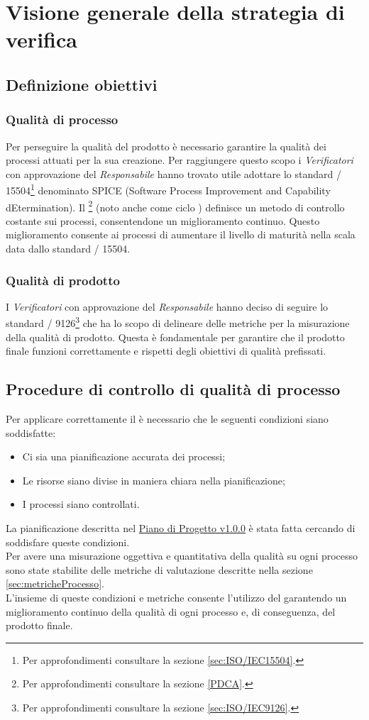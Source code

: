 \documentclass{scalatekids-article}
\begin{document}
\section{Visione generale della strategia di verifica}
\subsection{Definizione obiettivi}
\subsubsection{Qualità di processo}
Per perseguire la qualità del prodotto è necessario garantire la qualità dei processi attuati per la sua creazione. Per raggiungere questo scopo i \textit{Verificatori} con approvazione del \textit{Responsabile} hanno trovato utile adottare lo standard / 15504\footnote[1]{Per approfondimenti consultare la sezione \ref{sec:ISO/IEC15504}.} denominato SPICE (Software Process Improvement and Capability dEtermination). Il \footnote[2]{Per approfondimenti consultare la sezione \ref{PDCA}.} (noto anche come ciclo ) definisce un metodo di controllo costante sui processi, consentendone un miglioramento continuo. Questo miglioramento consente ai processi di aumentare il livello di maturità nella scala data dallo standard / 15504.
\subsubsection{Qualità di prodotto}
I \textit{Verificatori} con approvazione del \textit{Responsabile} hanno deciso di seguire lo standard / 9126\footnote[3]{Per approfondimenti consultare la sezione \ref{sec:ISO/IEC9126}.} che ha lo scopo di delineare delle metriche per la misurazione della qualità di prodotto. Questa è fondamentale per garantire che il prodotto  finale funzioni correttamente e rispetti degli obiettivi di qualità prefissati.
\subsection{Procedure di controllo di qualità di processo}
Per applicare correttamente il  è necessario che le seguenti condizioni siano soddisfatte:
\begin{itemize}
\item{Ci sia una pianificazione accurata dei processi;}
\item{Le risorse siano divise in maniera chiara nella pianificazione;}
\item{I processi siano controllati.}
\end{itemize}
La pianificazione descritta nel \href{run:./PianoDiProgetto\_v1.0.0.pdf}{Piano di Progetto v1.0.0} è stata fatta cercando di soddisfare queste condizioni.\\
Per avere una misurazione oggettiva e quantitativa della qualità su ogni processo sono state stabilite delle metriche di valutazione descritte nella sezione \ref{sec:metricheProcesso}.\\
L'insieme di queste condizioni e metriche consente l'utilizzo del  garantendo un miglioramento continuo della qualità di ogni processo e, di conseguenza, del prodotto finale.
\end{document}
